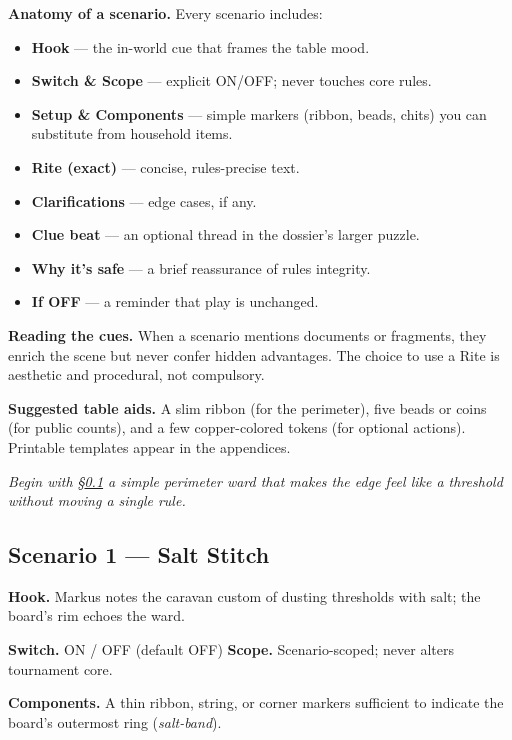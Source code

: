 \documentclass[11pt]{article}
\numberwithin{equation}{section} %
\theoremstyle{plain} %
\theoremstyle{definition} %
\theoremstyle{remark} %
\begin{document}
\medskip
\noindent\textbf{Anatomy of a scenario.} Every scenario includes:
\begin{itemize}\setlength\itemsep{0.3em}
  \item \textbf{Hook} — the in-world cue that frames the table mood.
  \item \textbf{Switch \& Scope} — explicit \textsc{ON/OFF}; never touches core rules.
  \item \textbf{Setup \& Components} — simple markers (ribbon, beads, chits) you can substitute from household items.
  \item \textbf{Rite (exact)} — concise, rules-precise text.
  \item \textbf{Clarifications} — edge cases, if any.
  \item \textbf{Clue beat} — an optional thread in the dossier’s larger puzzle.
  \item \textbf{Why it’s safe} — a brief reassurance of rules integrity.
  \item \textbf{If \textsc{OFF}} — a reminder that play is unchanged.
\end{itemize}

\medskip
\noindent\textbf{Reading the cues.} When a scenario mentions documents or fragments, they enrich the scene but never confer hidden advantages. The choice to use a Rite is aesthetic and procedural, not compulsory.

\medskip
\noindent\textbf{Suggested table aids.} A slim ribbon (for the perimeter), five beads or coins (for public counts), and a few copper-colored tokens (for optional actions). Printable templates appear in the appendices.

\medskip
\noindent\textit{Begin with \S\ref{scen:salt-stitch} \textemdash{} a simple perimeter ward that makes the edge feel like a threshold without moving a single rule.}

\subsection{Scenario 1 — Salt Stitch}
\label{scen:salt-stitch}

\noindent\textbf{Hook.} Markus notes the caravan custom of dusting thresholds with salt; the board’s rim echoes the ward.

\medskip
\noindent\textbf{Switch.} \textsc{ON / OFF} (default \textsc{OFF}) \hfill \textbf{Scope.} Scenario-scoped; never alters tournament core.

\medskip
\noindent\textbf{Components.} A thin ribbon, string, or corner markers sufficient to indicate the board’s outermost ring (\emph{salt-band}).
\end{document}
